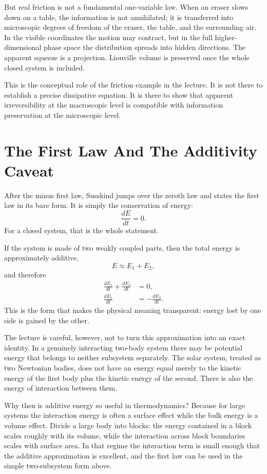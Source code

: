 But real friction is not a fundamental one-variable law. When an eraser slows down on a table, the information is not annihilated; it is transferred into microscopic degrees of freedom of the eraser, the table, and the surrounding air. In the visible coordinates the motion may contract, but in the full higher-dimensional phase space the distribution spreads into hidden directions. The apparent squeeze is a projection. Liouville volume is preserved once the whole closed system is included.

This is the conceptual role of the friction example in the lecture. It is not there to establish a precise dissipative equation. It is there to show that apparent irreversibility at the macroscopic level is compatible with information preservation at the microscopic level.

\section{The First Law And The Additivity Caveat}

After the minus first law, Susskind jumps over the zeroth law and states the first law in its bare form. It is simply the conservation of energy:
\begin{equation}
\frac{dE}{dt}=0.
\end{equation}
For a closed system, that is the whole statement.

If the system is made of two weakly coupled parts, then the total energy is approximately additive,
\[
E \approx E_1 + E_2,
\]
and therefore
\begin{align}
\frac{dE_1}{dt}+\frac{dE_2}{dt} &= 0, \\
\frac{dE_1}{dt} &= -\frac{dE_2}{dt}.
\end{align}
This is the form that makes the physical meaning transparent: energy lost by one side is gained by the other.

The lecture is careful, however, not to turn this approximation into an exact identity. In a genuinely interacting two-body system there may be potential energy that belongs to neither subsystem separately. The solar system, treated as two Newtonian bodies, does not have an energy equal merely to the kinetic energy of the first body plus the kinetic energy of the second. There is also the energy of interaction between them.

Why then is additive energy so useful in thermodynamics? Because for large systems the interaction energy is often a surface effect while the bulk energy is a volume effect. Divide a large body into blocks: the energy contained in a block scales roughly with its volume, while the interaction across block boundaries scales with surface area. In that regime the interaction term is small enough that the additive approximation is excellent, and the first law can be used in the simple two-subsystem form above.

